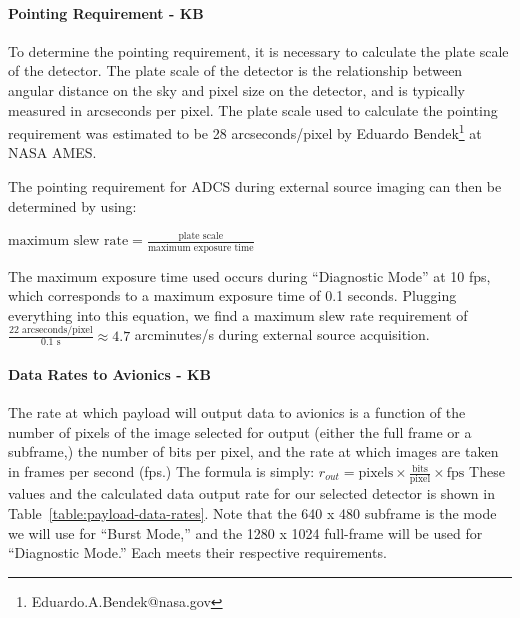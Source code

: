 \documentclass[12pt]{article}
\begin{document}
\paragraph{Pointing Requirement - KB}\label{sec:pointing_requirement}

To determine the pointing requirement, it is necessary to calculate the plate scale of the detector.
The plate scale of the detector is the relationship between angular distance on the sky and pixel size on the detector, and is typically measured in arcseconds per pixel. The plate scale used to calculate the pointing requirement was estimated to be 28 arcseconds/pixel by Eduardo Bendek\footnote{Eduardo.A.Bendek@nasa.gov} at NASA AMES. 

The pointing requirement for ADCS during external source imaging can then be determined by using:\\ 
\begin{center}
$\text{maximum slew rate} = \frac{\text{plate scale}}{\text{maximum exposure time}}$
\end{center}

The maximum exposure time used occurs during ``Diagnostic Mode'' at 10 fps, which corresponds to a maximum exposure time of 0.1 seconds. Plugging everything into this equation, we find a maximum slew rate requirement of $\frac{22 \text{ arcseconds/pixel}}{0.1 \text{ s}} \approx 4.7$ arcminutes/s during external source acquisition.

\paragraph{Data Rates to Avionics - KB}\label{sec:data_rate}
The rate at which payload will output data to avionics is a function of the number of pixels of the image selected for output (either the full frame or a subframe,) the number of bits per pixel, and the rate at which images are taken in frames per second (fps.) The formula is simply: $r_{out} = \text{pixels} \times \frac{\text{bits}}{\text{pixel}} \times \text{fps}$
These values and the calculated data output rate for our selected detector is shown in Table~\ref{table:payload-data-rates}. Note that the 640 x 480 subframe is the mode we will use for ``Burst Mode,'' and the 1280 x 1024 full-frame will be used for ``Diagnostic Mode.'' Each meets their respective requirements. 
\end{document}
